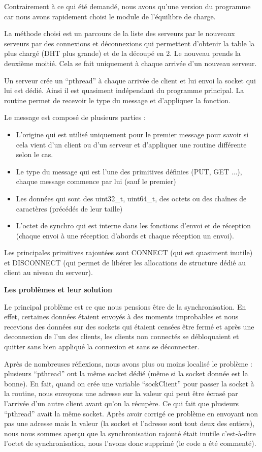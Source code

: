 \documentclass[a4paper,12pt]{article}
\begin{document}
Contrairement à ce qui été demandé, nous avons qu'une version du programme car nous avons rapidement choisi le module de l'équilibre de charge. 

La méthode choisi est un parcours de la liste des serveurs par le nouveaux serveurs par des connexions et déconnexions qui permettent d'obtenir la table la plus chargé (DHT plus grande) et de la découpé en 2. Le nouveau prends la deuxième moitié. Cela se fait uniquement à chaque arrivée d'un nouveau serveur.

Un serveur crée un ``pthread'' à chaque arrivée de client et lui envoi la socket qui lui est dédié. Ainsi il est quasiment indépendant du programme principal. La routine permet de recevoir le type du message et d'appliquer la fonction.

Le message est composé de plusieurs parties : 
\begin{itemize}
\item L'origine qui est utilisé uniquement pour le premier message pour savoir si cela vient d'un client ou d'un serveur et d'appliquer une routine différente selon le cas.
\item Le type du message qui est l'une des primitives définies (PUT, GET ...), chaque message commence par lui (sauf le premier)
\item Les données qui sont des uint32\_t, uint64\_t, des octets ou des chaînes de caractères (précédés de leur taille)
\item L'octet de synchro qui est interne dans les fonctions d'envoi et de réception (chaque envoi à une réception d'abords et chaque réception un envoi).
\end{itemize}

Les principales primitives rajoutées sont CONNECT (qui est quasiment inutile) et DISCONNECT (qui permet de libérer les allocations de structure dédié au client au niveau du serveur).

\vspace{0.5cm}
\large{\bf Les problèmes et leur solution} \normalsize

Le principal problème est ce que nous pensions être de la synchronisation. En effet, certaines données étaient envoyés à des moments improbables et nous recevions des données sur des sockets qui étaient censées être fermé et après une deconnexion de l'un des clients, les clients non connectés se débloquaient et quitter sans bien appliqué la connexion et sans se déconnecter.

Après de nombreuses réflexions, nous avons plus ou moins localisé le problème : plusieurs ``pthread'' ont la même socket dédié (même si la socket donnée est la bonne). En fait, quand on crée une variable ``sockClient'' pour passer la socket à la routine, nous envoyons une adresse sur la valeur qui peut être écrasé par l'arrivée d'un autre client avant qu'on la récupère. Ce qui fait que plusieurs ``pthread'' avait la même socket. Après avoir corrigé ce problème en envoyant non pas une adresse mais la valeur (la socket et l'adresse sont tout deux des entiers), nous nous sommes aperçu que la synchronisation rajouté était inutile c'est-à-dire l'octet de synchronisation, nous l'avons donc supprimé (le code a été commenté).
\end{document}
